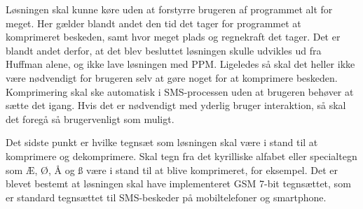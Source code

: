 Løsningen skal kunne køre uden at forstyrre brugeren af programmet alt for meget. Her gælder blandt andet den tid det tager for programmet at komprimeret beskeden, samt hvor meget plads og regnekraft det tager. Det er blandt andet derfor, at det blev besluttet løsningen skulle udvikles ud fra Huffman alene, og ikke lave løsningen med PPM. Ligeledes så skal det heller ikke være nødvendigt for brugeren selv at gøre noget for at komprimere beskeden. Komprimering skal ske automatisk i SMS-processen uden at brugeren behøver at sætte det igang. Hvis det er nødvendigt med yderlig bruger interaktion, så skal det foregå så brugervenligt som muligt.

Det sidste punkt er hvilke tegnsæt som løsningen skal være i stand til at komprimere og dekomprimere. Skal tegn fra det kyrilliske alfabet eller specialtegn som Æ, Ø, Å og ß være i stand til at blive komprimeret, for eksempel. Det er blevet bestemt at løsningen skal have implementeret GSM 7-bit tegnsættet, som er standard tegnsættet til SMS-beskeder på mobiltelefoner og smartphone.